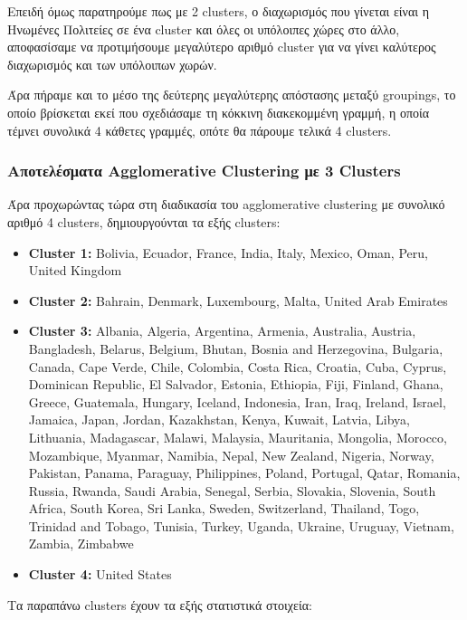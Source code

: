 \documentclass[12pt,a4paper]{article}
\begin{document}
Επειδή όμως παρατηρούμε πως με 2 clusters, ο διαχωρισμός που γίνεται είναι η Ηνωμένες Πολιτείες σε ένα cluster και όλες οι υπόλοιπες χώρες στο άλλο, αποφασίσαμε να προτιμήσουμε μεγαλύτερο αριθμό cluster για να γίνει καλύτερος διαχωρισμός και των υπόλοιπων χωρών.

Άρα πήραμε και το μέσο της δεύτερης μεγαλύτερης απόστασης μεταξύ groupings, το οποίο βρίσκεται εκεί που σχεδιάσαμε τη κόκκινη διακεκομμένη γραμμή, η οποία τέμνει συνολικά 4 κάθετες γραμμές, οπότε θα πάρουμε τελικά 4 clusters.

\subsubsection{Αποτελέσματα Agglomerative Clustering με 3 Clusters}

Άρα προχωρώντας τώρα στη διαδικασία του agglomerative clustering με συνολικό αριθμό 4 clusters, δημιουργούνται τα εξής clusters:

\begin{itemize}
    \item \textbf{Cluster 1:} Bolivia, Ecuador, France, India, Italy, Mexico, Oman, Peru, United Kingdom
    \item \textbf{Cluster 2:} Bahrain, Denmark, Luxembourg, Malta, United Arab Emirates
    \item \textbf{Cluster 3:} Albania, Algeria, Argentina, Armenia, Australia, Austria, Bangladesh, Belarus, Belgium, Bhutan, Bosnia and Herzegovina, Bulgaria, Canada, Cape Verde, Chile, Colombia, Costa Rica, Croatia, Cuba, Cyprus, Dominican Republic, El Salvador, Estonia, Ethiopia, Fiji, Finland, Ghana, Greece, Guatemala, Hungary, Iceland, Indonesia, Iran, Iraq, Ireland, Israel, Jamaica, Japan, Jordan, Kazakhstan, Kenya, Kuwait, Latvia, Libya, Lithuania, Madagascar, Malawi, Malaysia, Mauritania, Mongolia, Morocco, Mozambique, Myanmar, Namibia, Nepal, New Zealand, Nigeria, Norway, Pakistan, Panama, Paraguay, Philippines, Poland, Portugal, Qatar, Romania, Russia, Rwanda, Saudi Arabia, Senegal, Serbia, Slovakia, Slovenia, South Africa, South Korea, Sri Lanka, Sweden, Switzerland, Thailand, Togo, Trinidad and Tobago, Tunisia, Turkey, Uganda, Ukraine, Uruguay, Vietnam, Zambia, Zimbabwe
    \item \textbf{Cluster 4:} United States
\end{itemize}

Τα παραπάνω clusters έχουν τα εξής στατιστικά στοιχεία:
\end{document}
